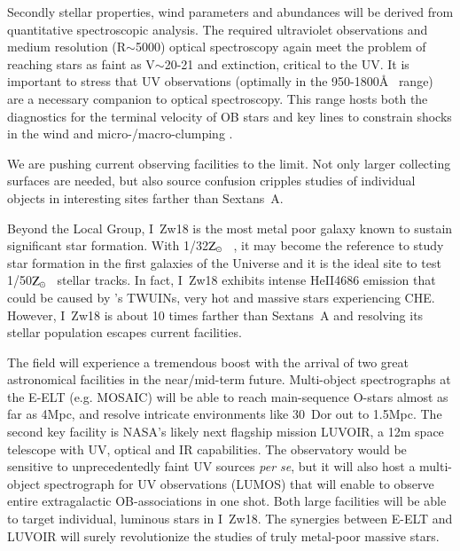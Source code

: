 \documentclass{iau}
\newcommand{\Zsun}{$\rm Z_{\odot}$}
\newcommand{\vinf}{\mbox{$v_{\infty}$}}
\begin{document}
Secondly stellar properties, wind parameters and abundances will be derived
from quantitative spectroscopic analysis. The required
ultraviolet observations and medium resolution (R$\sim$5000)
optical spectroscopy again meet the problem of reaching
stars as faint as V$\sim$20-21 and extinction, critical to the UV.
It is important to stress that UV observations
(optimally in the 950-1800\AA~ range) are a necessary companion
to optical spectroscopy.
This range hosts both the diagnostics
for the terminal velocity of OB stars
and key lines to constrain shocks in the wind \citep{GB04}
and micro-/macro-clumping \citep{SPFO11}.


We are
pushing current observing facilities to the limit.
Not only larger collecting surfaces are needed, but also source
confusion cripples studies of individual objects in interesting sites
farther than Sextans~A.

Beyond the Local Group, I~Zw18 \citep[18.2Mpc][]{Aal07} is the most metal poor galaxy known to
sustain significant star formation.
With 1/32\Zsun~ \citep{VIP98}, it may become the reference to study star formation in the first galaxies
of the Universe
and it is the ideal site to test  1/50\Zsun~ stellar tracks.
In fact, I~Zw18 exhibits intense HeII4686 emission \citep{Keal15} that could be
caused by \citet{Szal15}'s TWUINs, very hot and massive stars experiencing CHE.
However, I~Zw18 is about 10 times farther than Sextans~A
and resolving its stellar population escapes current facilities.


The field will experience a tremendous boost with the arrival of
two great astronomical facilities in the near/mid-term future.
Multi-object spectrographs at the E-ELT (e.g. MOSAIC) will 
be able to reach main-sequence O-stars almost as far as 4Mpc, %
and resolve intricate environments like 30~Dor out to 1.5Mpc.
The second key facility is NASA's likely next flagship mission LUVOIR,
a 12m space telescope with UV, optical and IR capabilities.
The observatory would be 
sensitive to unprecedentedly faint UV sources \textit{per se},
but it will also host a multi-object spectrograph for UV observations (LUMOS)
that will enable to observe entire extragalactic OB-associations in one shot.
Both large facilities will be able to target individual, luminous stars in I~Zw18.
The synergies between E-ELT and LUVOIR will surely  revolutionize
the studies of truly metal-poor massive stars.


\acknowledgments
\end{document}
